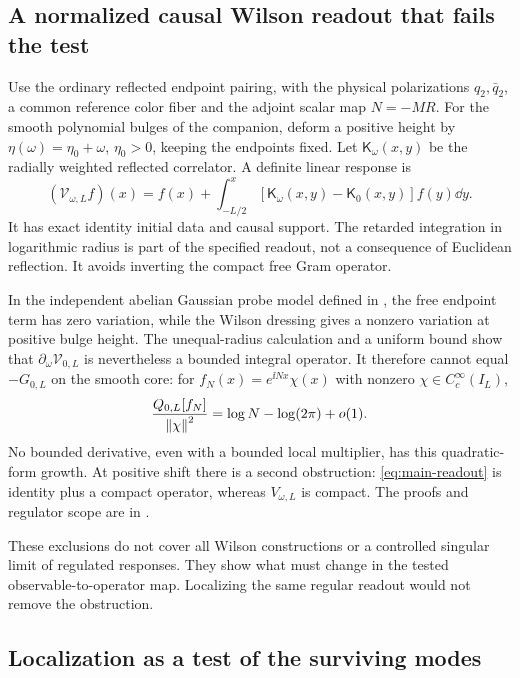 \subsection{A normalized causal Wilson readout that fails the test}

Use the ordinary reflected endpoint pairing, with the physical
polarizations $q_2,\bar q_2$, a common reference color fiber and
the adjoint scalar map $N=-MR$. For the smooth polynomial bulges
of the companion, deform a positive height by
$\eta(\omega)=\eta_0+\omega$, $\eta_0>0$, keeping the endpoints
fixed. Let $\mathsf K_\omega(x,y)$ be the radially weighted
reflected correlator. A definite linear response is
\begin{equation}\label{eq:main-readout}
 (\mathcal V_{\omega,L}f)(x)=f(x)+
 \int_{-L/2}^{x}
 [\mathsf K_\omega(x,y)-\mathsf K_0(x,y)]f(y)\dd y.
\end{equation}
It has exact identity initial data and causal support. The
retarded integration in logarithmic radius is part of the
specified readout, not a consequence of Euclidean reflection.
It avoids inverting the compact free Gram operator.

In the independent abelian Gaussian probe model defined in
\cite[Sections~S10.3--S10.4]{Supplement}, the free endpoint term
has zero variation, while the Wilson dressing gives a nonzero
variation at positive bulge height. The unequal-radius
calculation and a uniform bound show that
$\partial_\omega\mathcal V_{0,L}$ is nevertheless a bounded
integral operator. It therefore cannot equal $-G_{0,L}$ on the
smooth core: for $f_N(x)=e^{\ii Nx}\chi(x)$ with nonzero
$\chi\in C_c^\infty(I_L)$,
\[
 \frac{Q_{0,L}[f_N]}{\left\lVert\chi\right\rVert^2}
 =\log N-\log(2\pi)+o(1).
\]
No bounded derivative, even with a bounded local multiplier,
has this quadratic-form growth. At positive shift there is a
second obstruction: \eqref{eq:main-readout} is identity plus a
compact operator, whereas $V_{\omega,L}$ is compact.
The proofs and regulator scope are in
\cite[Section~S10.5]{Supplement}.

These exclusions do not cover all Wilson constructions or a
controlled singular limit of regulated responses. They show
what must change in the tested observable-to-operator map.
Localizing the same regular readout would not remove the
obstruction.

\subsection{Localization as a test of the surviving modes}

